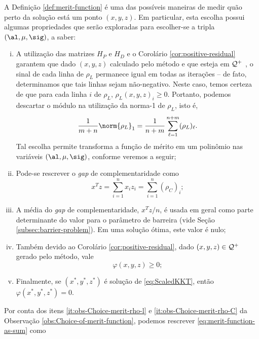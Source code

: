 \begin{obs}
\label{obs:Choice-of-merit-function}
A Definição \ref{def:merit-function} é uma das possíveis maneiras de medir quão
perto da solução está um ponto $(x,y,z)$. Em particular,  esta escolha possui algumas
propriedades que serão exploradas para escolher-se a tripla $(\al,\mu,\sig)$, a
saber:

\begin{enumerate}[(i)] 

	

\item \label{it:obs-Choice-merit-rho-l} A utilização das matrizes $H_P$ e $H_D$  e o Corolário
\ref{cor:positive-residual} garantem que dado $(x,y,z)$ calculado pelo
método e que esteja em $\mathcal{Q}^+$ ,  o sinal de cada linha de $\rho_{L}$ permanece igual em todas as iterações --  de fato, determinamos que tais linhas sejam não-negativo. Neste caso, temos certeza de que para cada linha $i$ de $\rho_{L}$,  $\rho_L(x,y,z)_{i}\geq 0$. Portanto, podemos descartar o módulo na utilização da norma-1 de $\rho_{L}$, isto é,
\[\frac{1}{m+n}\norm{\rho_L}_1 = \frac{1}{n+m}\sum_{\ell=1}^{n+m}(\rho_L)_\ell. \] 
Tal escolha permite transforma a função de mérito em um polinômio nas variáveis $(\al,\mu,\sig)$, conforme veremos a seguir; 



\item \label{it:obs-Choice-merit-rho-C} Pode-se rescrever o
\emph{gap} de complementaridade como
 \[x^Tz = \sum_{i=1}^{n}x_iz_i = \sum_{i=1}^{n}(\rho_C)_i;\]

\item A média do \emph{gap} de complementaridade, $x^Tz/n$, é usada em geral
como parte determinante do valor para o parâmetro de barreira (vide Seção
\ref{subsec:barrier-problem}). Em uma solução ótima, este valor é
nulo;    
\item Também devido ao Corolário \ref{cor:positive-residual}, dado
$(x,y,z)\in\mathcal{Q}^+$ gerado pelo método, vale
\[
\varphi(x,y,z)\geq0;
\]
	\item Finalmente, se $(x^*,y^*,z^*)$ é solução de
\eqref{eq:ScaledKKT}, então $\varphi(x^*,y^*,z^*)=0$.
\end{enumerate}
\end{obs}


Por conta dos itens \eqref{it:obs-Choice-merit-rho-l} e \eqref{it:obs-Choice-merit-rho-C} da Observação \ref{obs:Choice-of-merit-function}, podemos rescrever
\eqref{eq:merit-function-as-sum} como


